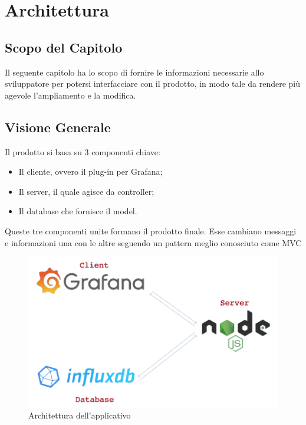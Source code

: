 \section{Architettura}\label{architettura}
\subsection{Scopo del Capitolo}
Il seguente capitolo ha lo scopo di fornire le informazioni necessarie allo sviluppatore per potersi interfacciare con il prodotto, in modo tale da rendere più agevole l'ampliamento e la modifica.

\subsection{Visione Generale}\label{archGenerale}
Il prodotto si basa su 3 componenti chiave: 
\begin{itemize}
	\item Il cliente, ovvero il plug-in per Grafana; 
	\item Il server, il quale agisce da controller; 
	\item Il database che fornisce il model.
\end{itemize}
Queste tre componenti unite formano il prodotto finale. Esse cambiano messaggi e informazioni una con le altre seguendo un pattern meglio conosciuto come MVC\glossario 

\begin{figure}[H]
	\begin{center}
		\includegraphics[scale=0.5]{./images/architettura.png} 
	\end{center}
	\caption{Architettura dell'applicativo}
\end{figure}


